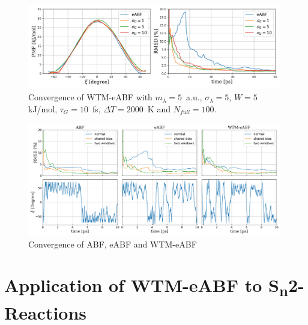 \begin{figure}[H]
  \centering
    \includegraphics[width=0.99\textwidth]{bilder/benchmark/meta_eABF_benchmark_var}
   \caption{Convergence of WTM-eABF with $m_\lambda=5$~a.u., $\sigma_\lambda=5$, $W=5$ kJ/mol, $\tau_G=10$~fs, $\Delta T=2000$~K and $N_{full}=100$.}
   \label{fig:conf meABF var}
\end{figure}


\begin{figure}[H]
  \centering
    \includegraphics[width=0.99\textwidth]{bilder/benchmark/ABF_acc_benchmark}
   \caption{Convergence of ABF, eABF and WTM-eABF}
   \label{fig:conf ABF}
\end{figure}




\section{Application of WTM-eABF to S\textsubscript{n}2-Reactions}
\label{sec:Sn2}


